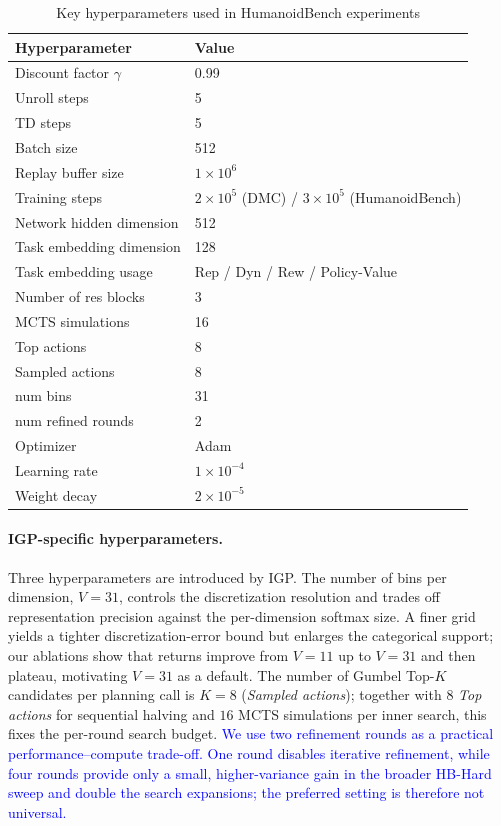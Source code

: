 \begin{table}[t]
\centering
\caption{Key hyperparameters used in HumanoidBench experiments}
\label{tab:key_hyperparams}
\begin{tabular}{ll}
\toprule
\textbf{Hyperparameter} & \textbf{Value} \\
\midrule
Discount factor $\gamma$ & 0.99 \\
Unroll steps & 5 \\
TD steps & 5 \\
Batch size & 512 \\
Replay buffer size & $1\times 10^{6}$\\
Training steps & $2\times 10^{5}$ (DMC) / $3\times 10^{5}$ (HumanoidBench) \\
\midrule
Network hidden dimension & 512 \\
Task embedding dimension & 128 \\
Task embedding usage & Rep / Dyn / Rew / Policy-Value \\
Number of res blocks & 3 \\
\midrule
MCTS simulations & 16 \\
Top actions & 8 \\
Sampled actions & 8 \\
num bins & 31 \\
num refined rounds & 2 \\
\midrule
Optimizer & Adam \\
Learning rate & $1\times 10^{-4}$ \\
Weight decay & $2\times 10^{-5}$ \\
\bottomrule
\end{tabular}
\end{table}

\paragraph{IGP-specific hyperparameters.} Three hyperparameters are introduced by IGP. The number of bins per dimension, $V=31$, controls the discretization resolution and trades off representation precision against the per-dimension softmax size. A finer grid yields a tighter discretization-error bound but enlarges the categorical support; our ablations show that returns improve from $V=11$ up to $V=31$ and then plateau, motivating $V=31$ as a default. The number of Gumbel Top-$K$ candidates per planning call is $K=8$ (\textit{Sampled actions}); together with $8$ \textit{Top actions} for sequential halving and $16$ MCTS simulations per inner search, this fixes the per-round search budget. \textcolor{blue}{We use two refinement rounds as a practical performance--compute trade-off. One round disables iterative refinement, while four rounds provide only a small, higher-variance gain in the broader HB-Hard sweep and double the search expansions; the preferred setting is therefore not universal.}

